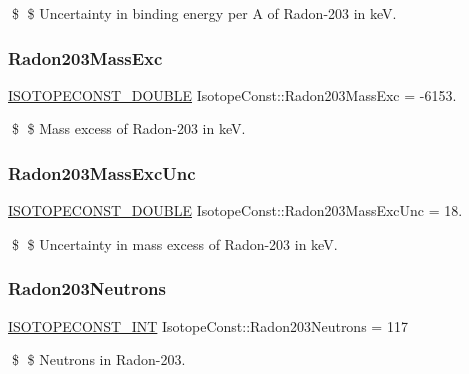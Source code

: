 \$ \$ Uncertainty in binding energy per A of Radon-\/203 in keV. \mbox{\label{group___isotope_const-_radon-_rn203_ga7285326ada3795422eff31ec1f877282}} 
\subsubsection{\texorpdfstring{Radon203\+Mass\+Exc}{Radon203MassExc}}
{\footnotesize\ttfamily \mbox{\hyperlink{group___isotope_const-_macros_ga8f45a7272ce02c0b4c65c44636ed719a}{I\+S\+O\+T\+O\+P\+E\+C\+O\+N\+S\+T\+\_\+\+D\+O\+U\+B\+LE}} Isotope\+Const\+::\+Radon203\+Mass\+Exc = -\/6153.}

\$ \$ Mass excess of Radon-\/203 in keV. \mbox{\label{group___isotope_const-_radon-_rn203_ga54a72eea5c2369dc64e720265054cb14}} 
\subsubsection{\texorpdfstring{Radon203\+Mass\+Exc\+Unc}{Radon203MassExcUnc}}
{\footnotesize\ttfamily \mbox{\hyperlink{group___isotope_const-_macros_ga8f45a7272ce02c0b4c65c44636ed719a}{I\+S\+O\+T\+O\+P\+E\+C\+O\+N\+S\+T\+\_\+\+D\+O\+U\+B\+LE}} Isotope\+Const\+::\+Radon203\+Mass\+Exc\+Unc = 18.}

\$ \$ Uncertainty in mass excess of Radon-\/203 in keV. \mbox{\label{group___isotope_const-_radon-_rn203_gaebd86f550606ac5d638b6c0ea6c5be7b}} 
\subsubsection{\texorpdfstring{Radon203\+Neutrons}{Radon203Neutrons}}
{\footnotesize\ttfamily \mbox{\hyperlink{group___isotope_const-_macros_ga5f18360b3e99483a35c32d789e62621c}{I\+S\+O\+T\+O\+P\+E\+C\+O\+N\+S\+T\+\_\+\+I\+NT}} Isotope\+Const\+::\+Radon203\+Neutrons = 117}

\$ \$ Neutrons in Radon-\/203. \mbox{\label{group___isotope_const-_radon-_rn203_ga8d2f95b304db224e6f625ec0e5a0a532}} 
